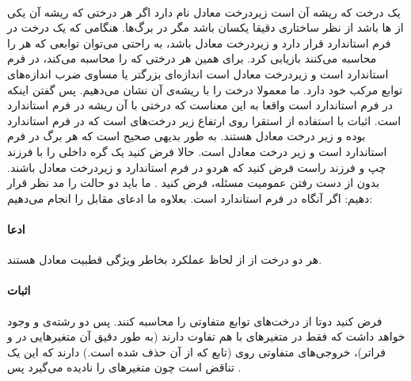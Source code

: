 \documentclass[a4paper]{article}
\begin{document}
	\paragraph{}
	یک درخت که ریشه آن
	است زیردرخت معادل نام دارد اگر هر درختی که ریشه آن یکی از
	ها باشد از نظر ساختاری دقیقا یکسان باشد مگر در برگ‌ها. هنگامی که یک درخت در فرم استاندارد قرار دارد و زیردرخت
	معادل باشد، به راحتی می‌توان توابعی که هر 
	را محاسبه می‌کنند بازیابی کرد. برای همین هر درختی که 
	را محاسبه می‌کند، در فرم استاندارد است و زیردرخت معادل است اندازه‌ای بزرگتر یا مساوی ضرب اندازه‌های توابع
	مرکب خود دارد. ما معمولا درخت را با ریشه‌ی آن نشان می‌دهیم. پس گفتن اینکه
	در فرم استاندارد است واقعا به این معناست که درختی با آن ریشه در فرم استاندارد است. اثبات با استفاده از استقرا
	روی ارتفاع زیر درخت‌های
	است که در فرم استاندارد بوده و زیر درخت معادل هستند. به طور بدیهی صحیح است که هر برگ در فرم استاندارد است و
	زیر درخت معادل است. حالا فرض کنید یک گره داخلی 
	را با فرزند چپ
	و فرزند راست
	فرض کنید که هردو در فرم استاندارد و زیردرخت معادل باشند. بدون از دست رفتن عمومیت مسئله، فرض کنید
	.
	ما باید دو حالت را مد نظر قرار دهیم: اگر 
	آنگاه 
	در فرم استاندارد است. بعلاوه ما ادعای مقابل را انجام می‌دهیم:
	\paragraph{ادعا}
	هر دو درخت از 
	از لحاظ عملکرد بخاطر ویژگی قطبیت معادل هستند.
	\paragraph{اثبات}
	فرض کنید دوتا از درخت‌های
	توابع متفاوتی را محاسبه کنند. پس دو رشته‌ی
	و
	وجود خواهد داشت که فقط در متغیرهای 
	با هم تفاوت دارند (به طور دقیق آن متغیرهایی در 
	و فراتر)، خروجی‌های متفاوتی روی
	(تابع 
	که 
	از آن حذف شده است.) دارند که این یک تناقض است چون 
	متغیرهای
	را نادیده می‌گیرد پس
	.
\end{document}
